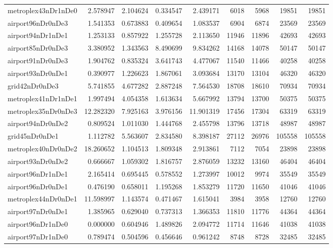 \begin{longtable}{|l|r|r|r|r|r|r|r|r|}
metroplex43nDr1nDe0 & 2.578947 & 2.104624 & 0.334547 & 2.439171 & 6018 & 5968 & 19851 & 19851 \\
airport96nDr0nDe3 & 1.541353 & 0.673883 & 0.409654 & 1.083537 & 6904 & 6874 & 23569 & 23569 \\
airport94nDr1nDe1 & 1.253133 & 0.857922 & 1.255728 & 2.113650 & 11946 & 11896 & 42693 & 42693 \\
airport85nDr0nDe3 & 3.380952 & 1.343563 & 8.490699 & 9.834262 & 14168 & 14078 & 50147 & 50147 \\
airport91nDr0nDe3 & 1.904762 & 0.835324 & 3.641743 & 4.477067 & 11540 & 11466 & 40258 & 40258 \\
airport93nDr0nDe1 & 0.390977 & 1.226623 & 1.867061 & 3.093684 & 13170 & 13104 & 46320 & 46320 \\
grid42nDr0nDe3 & 5.741855 & 4.677282 & 2.887248 & 7.564530 & 18708 & 18610 & 70934 & 70934 \\
metroplex41nDr1nDe1 & 1.997494 & 4.054358 & 1.613634 & 5.667992 & 13794 & 13700 & 50375 & 50375 \\
metroplex35nDr0nDe3 & 12.282320 & 7.925163 & 3.976156 & 11.901319 & 17456 & 17304 & 63319 & 63319 \\
airport94nDr0nDe2 & 0.809524 & 1.011030 & 1.444768 & 2.455798 & 13796 & 13718 & 48987 & 48987 \\
grid45nDr0nDe1 & 1.112782 & 5.563607 & 2.834580 & 8.398187 & 27112 & 26976 & 105558 & 105558 \\
metroplex40nDr0nDe2 & 18.260652 & 1.104513 & 1.809348 & 2.913861 & 7112 & 7054 & 23898 & 23898 \\
airport93nDr0nDe2 & 0.666667 & 1.059302 & 1.816757 & 2.876059 & 13232 & 13160 & 46404 & 46404 \\
airport96nDr1nDe1 & 2.165414 & 0.695445 & 0.578552 & 1.273997 & 10012 & 9974 & 35549 & 35549 \\
airport96nDr0nDe1 & 0.476190 & 0.658011 & 1.195268 & 1.853279 & 11720 & 11650 & 41046 & 41046 \\
metroplex44nDr0nDe1 & 11.598997 & 1.143574 & 0.471467 & 1.615041 & 3984 & 3958 & 12760 & 12760 \\
airport97nDr0nDe1 & 1.385965 & 0.629040 & 0.737313 & 1.366353 & 11810 & 11776 & 44364 & 44364 \\
airport96nDr1nDe0 & 0.000000 & 0.604946 & 1.489826 & 2.094772 & 11714 & 11646 & 41038 & 41038 \\
airport97nDr1nDe0 & 0.789474 & 0.504596 & 0.456646 & 0.961242 & 8748 & 8728 & 32485 & 32485 \\

\end{longtable}
